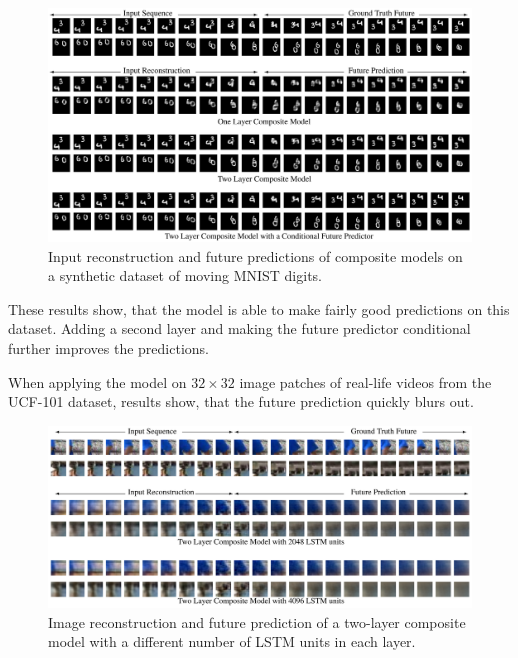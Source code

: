 \begin{figure}[H]
    \centering
    \includegraphics[width=\textwidth]{img_deep/unsupervisedlstms_movingmnist}
    \caption{Input reconstruction and future predictions of composite models on a synthetic dataset of moving MNIST digits. \cite{srivastava_unsupervised_2015}}
    \label{fig:unsupervisedlstms_movingmnist}
\end{figure}

These results show, that the model is able to make fairly good predictions on this dataset.
Adding a second layer and making the future predictor conditional further improves the predictions.

When applying the model on $32 \times 32$ image patches of real-life videos from the UCF-101 dataset, results show, that the future prediction quickly blurs out.

\begin{figure}[H]
    \centering
    \includegraphics[width=\textwidth]{img_deep/unsupervisedlstms_ucfpatches.png}
    \caption{Image reconstruction and future prediction of a two-layer composite model with a different number of LSTM units in each layer. \cite{srivastava_unsupervised_2015}}
    \label{fig:unsupervisedlstms_ucfpatches}
\end{figure}

